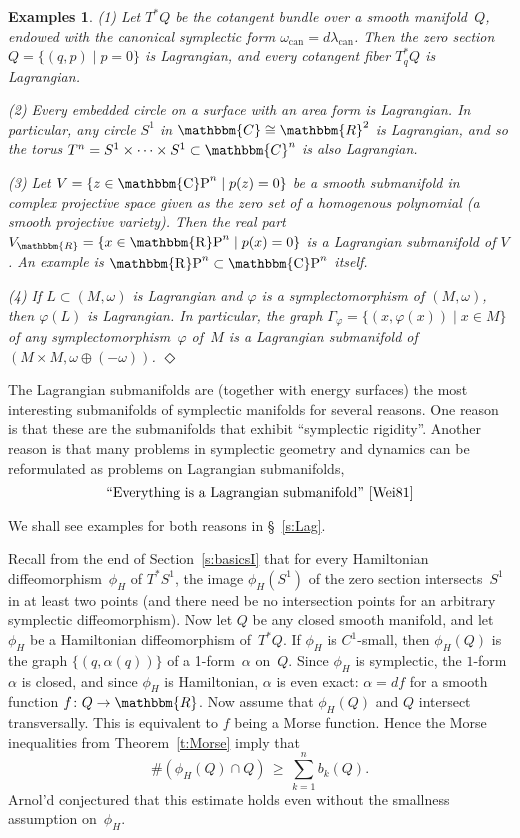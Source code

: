 \documentclass[12pt,twoside]{amsart}
\theoremstyle{plain}
\newtheorem{examples}[theorem]{Examples}
\numberwithin{figure}{section}
\numberwithin{equation}{section}
\newcommand{\diam}{\hspace*{\fill} $\Diamond$}
\def\s{\smallskip}
\def\m{\medskip}
\def\can{\operatorname{can}}
\def\ga{\alpha}
\def\gf{\varphi}
\def\go{\omega}
\def\CC{\mathbbm{C}}
\def\RR{\mathbbm{R}}
\def\RP{\operatorname{\mathbbm{R}P}}
\def\CP{\operatorname{\mathbbm{C}P}}
\def\m{\medskip}
\begin{document}
\begin{examples}
{\rm
(1)
Let $T^*Q$ be the cotangent bundle over a smooth manifold~$Q$,
endowed with the canonical symplectic form $\omega_{\can} = d \lambda_{\can}$.
Then the zero section $Q = \{ (q,p) \mid p = 0\}$ is Lagrangian, 
and every cotangent fiber $T_q^*Q$ is Lagrangian.

\s 
(2)
Every embedded circle on a surface with an area form is Lagrangian. In particular, 
any circle $S^1$ in $\CC \cong \RR^2$ is Lagrangian, 
and so the torus $T^n = S^1 \times \dots \times S^1 \subset \CC^n$ is also Lagrangian.

\s 
(3)
Let $V = \{ z \in \CP^n \mid p(z)=0 \}$ be a smooth submanifold in complex projective space
given as the zero set of a homogenous polynomial (a smooth projective variety). 
Then the real part $V_{\RR} = \{ x \in \RP^n \mid p(x)=0 \}$
is a Lagrangian submanifold of $V$.
An example is $\RP^n \subset \CP^n$ itself.  

\s 
(4)
If $L \subset (M,\go)$ is Lagrangian and $\gf$ is a symplectomorphism of $(M,\go)$,
then $\gf (L)$ is Lagrangian.
In particular, the graph $\Gamma_{\gf} = \{ (x, \gf (x)) \mid x \in M \}$  
of any symplectomorphism~$\gf$ of~$M$ is a Lagrangian submanifold of $(M \times M, \go \oplus (-\go))$.
\diam
}
\end{examples}

The Lagrangian submanifolds are (together with energy surfaces) the most interesting submanifolds of symplectic manifolds for several reasons. 
One reason is that these are the submanifolds that exhibit 
``symplectic rigidity''.
Another reason is that many problems in symplectic geometry and dynamics can be reformulated as problems 
on Lagrangian submanifolds,
%
\begin{equation} \label{dictum:Wein}
\mbox{``Everything is a Lagrangian submanifold''~\cite{Wei81}}
\end{equation}

We shall see examples for both reasons in \S~\ref{s:Lag}.

\m
Recall from the end of Section~\ref{s:basicsI}
that for every Hamiltonian diffeomorphism~$\phi_H$ of $T^*S^1$,
the image $\phi_H(S^1)$ of the zero section intersects~$S^1$ in at least two points
(and there need be no intersection points for an arbitrary symplectic diffeomorphism).
% 
Now let $Q$ be any closed smooth manifold, 
and let $\phi_H$ be a Hamiltonian diffeomorphism of~$T^*Q$.
If $\phi_H$ is $C^1$-small, then $\phi_H (Q)$ is the graph
$\{ (q,\ga(q))\}$ of a 1-form~$\ga$ on~$Q$.
Since $\phi_H$ is symplectic, the $1$-form $\ga$ is closed, 
and since $\phi_H$ is Hamiltonian, $\ga$ is even exact: 
$\ga = df$ for a smooth function $f \colon Q \to \RR$.
Now assume that $\phi_H(Q)$ and $Q$ intersect transversally.
This is equivalent to $f$ being a Morse function. 
Hence the Morse inequalities from Theorem~\ref{t:Morse} imply that 
%
\begin{equation} \label{e:MorseLag}
\# (\phi_H(Q) \cap Q) \,\geqslant\, \sum_{k=1}^n b_k(Q).
\end{equation}
%
Arnol'd conjectured that this estimate 
holds even without the smallness assumption on~$\phi_H$.
\end{document}
